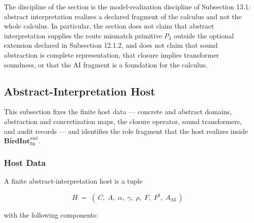 \documentclass[11pt]{article}
\theoremstyle{definition}
\begin{document}
The discipline of the section is the model-realization discipline of Subsection 13.1: abstract interpretation realizes a declared fragment of the calculus and not the whole calculus. In particular, the section does not claim that abstract interpretation supplies the route mismatch primitive \(P_3\) outside the optional extension declared in Subsection 12.1.2, and does not claim that sound abstraction is complete representation, that closure implies transformer soundness, or that the AI fragment is a foundation for the calculus.

\subsection{Abstract-Interpretation Host}

This subsection fixes the finite host data --- concrete and abstract domains, abstraction and concretization maps, the closure operator, sound transformers, and audit records --- and identifies the role fragment that the host realizes inside \(\mathbf{BirdInt}^{\mathrm{aud}}_{\mathrm{fin}}\).

\subsubsection{Host Data}

A finite abstract-interpretation host is a tuple

\[
H\;=\;(\,C,\;A,\;\alpha,\;\gamma,\;\rho,\;F,\;F^{\sharp},\;A_{\mathrm{AI}}\,)
\]

with the following components:
\end{document}
